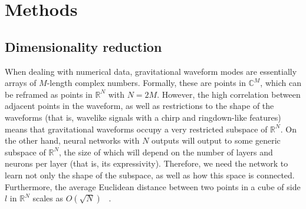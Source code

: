 \documentclass[%
 reprint,
superscriptaddress,
nofootinbib,
 amsmath,amssymb,
 aps,
prd,
floatfix,
]{revtex4-2}
\begin{document}
\section{\label{sec:methods} Methods}

\subsection{\label{sec:dimensionality_reduction}Dimensionality reduction}
When dealing with numerical data, gravitational waveform modes are essentially arrays of $M$-length complex numbers. Formally, these are points in $\mathbb{C}^M$, which can be reframed as points in $\mathbb{R}^{N}$ with $N=2M$. However, the high correlation between adjacent points in the waveform, as well as restrictions to the shape of the waveforms (that is, wavelike signals with a chirp and ringdown-like features) means that gravitational waveforms occupy a very restricted subspace of  $\mathbb{R}^{N}$. On the other hand, neural networks with $N$ outputs will output to some generic subspace of $\mathbb{R}^{N}$, the size of which will depend on the number of layers and neurons per layer (that is, its expressivity). Therefore, we need the network to learn not only the shape of the subspace, as well as how this space is connected. Furthermore, the average Euclidean distance between two points in a cube of side $l$ in  $\mathbb{R}^{N}$ scales as $O(\sqrt{N})$~\cite{avg_dist_ndim_ref} . 
\end{document}
